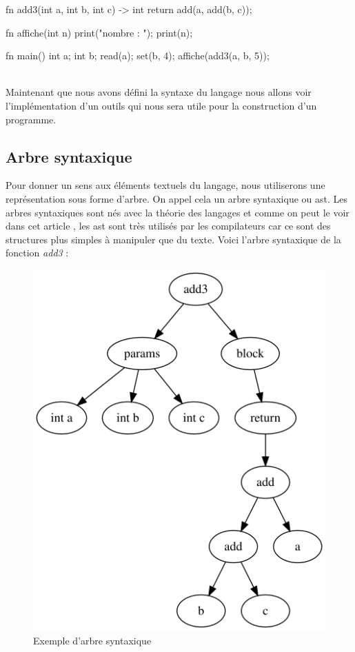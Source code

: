 \documentclass[a4paper]{article}%
\begin{document}
\begin{grammar}[language=C++]
fn add3(int a, int b, int c) -> int {
    return add(a, add(b, c));
}

fn affiche(int n) {
    print("nombre : ");
    print(n);
}

fn main() {
    int a;
    int b;
    read(a);
    set(b, 4);
    affiche(add3(a, b, 5));
}
\end{grammar}\leavevmode\newline
~\\

Maintenant que nous avons défini la syntaxe du langage nous allons voir
l'implémentation d'un outils qui nous sera utile pour la construction d'un
programme.


\clearpage{}

\subsection{Arbre syntaxique}

Pour donner un sens aux éléments textuels du langage, nous utiliserons une
représentation sous forme d'arbre. On appel cela un arbre syntaxique ou
\gls{ast}. Les arbres syntaxiques sont nés avec la théorie des langages et comme
on peut le voir dans cet article \cite{compilerTICH}, les \gls{ast} sont très
utilisés par les compilateurs car ce sont des structures plus simples à
manipuler que du texte. Voici l'arbre syntaxique de la fonction \textit{add3} :

\begin{figure}[h]
  \begin{center}
  \includegraphics[scale=0.4]{img/ast1.png}
  \caption{Exemple d'arbre syntaxique}
  \end{center}
\end{figure}
\end{document}
